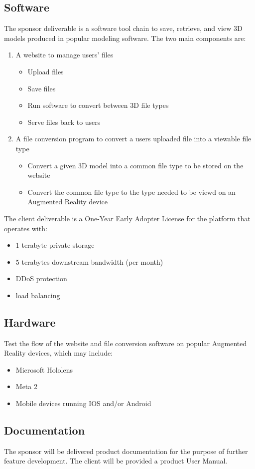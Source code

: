 \subsection{Software}
The sponsor deliverable is a software tool chain to save, retrieve, and view 3D models produced in popular modeling software. The two main components are:

\begin{enumerate}
	\item A website to manage users' files
		\begin{itemize}
			\item Upload files
			\item Save files
			\item Run software to convert between 3D file types
			\item Serve files back to users
		\end{itemize}
	\item A file conversion program to convert a users uploaded file into a viewable file type
		\begin{itemize}
			\item Convert a given 3D model into a common file type to be stored on the website
			\item Convert the common file type to the type needed to be viewd on an Augmented Reality device
		\end{itemize}
\end{enumerate}

\noindent The client deliverable is a One-Year Early Adopter License for the platform that operates with:

\begin{itemize} 
	\item 1 terabyte private storage 
	\item 5 terabytes downstream bandwidth (per month)
	\item DDoS protection
	\item load balancing
\end{itemize} 

\subsection{Hardware}

Test the flow of the website and file conversion software on popular Augmented Reality devices, which may include:
\begin{itemize}
	\item Microsoft Hololens
	\item Meta 2
	\item Mobile devices running IOS and/or Android
\end{itemize}

\subsection{Documentation}

The sponsor will be delivered product documentation for the purpose of further feature development. The client will be provided a product User Manual. 
